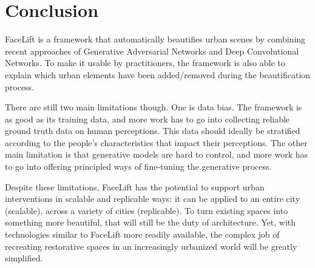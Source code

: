 \section{Conclusion}
\label{sec:discussion}

FaceLift is a  framework that automatically beautifies urban scenes by combining recent approaches of Generative Adversarial Networks and Deep Convolutional Networks. To make it usable by practitioners, the framework is also able to explain which urban elements have been added/removed during the beautification process. 

There are still two main limitations though. One is data bias. The framework is as good as its training data, and more work has to go into collecting reliable ground truth data on human perceptions. This data should ideally be stratified according to the people's characteristics that  impact their perceptions. The other main limitation is that generative models are hard to control, and more work has to go into offering principled ways of fine-tuning the generative process.

Despite these limitations, FaceLift has the potential to support urban interventions  in scalable  and replicable ways: it can be applied to an entire city (scalable), across a variety of cities (replicable). To turn existing spaces into something more beautiful, that will still be the duty of architecture. Yet, with technologies similar to FaceLift more readily available, the complex job of recreating restorative spaces in an increasingly urbanized world will be greatly simplified.  





